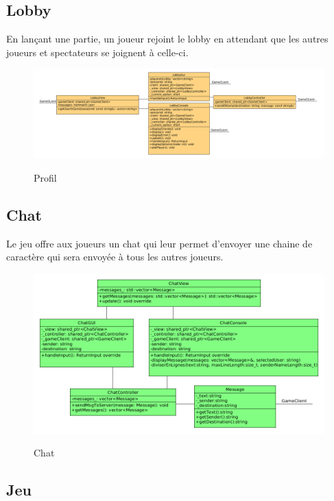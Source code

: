 \documentclass[../design_fonctionnement_sys.tex]{subfiles}
\begin{document}
\newpage
\subsection{Lobby}
En lançant une partie, un joueur rejoint le lobby en attendant que les autres joueurs et spectateurs se joignent à celle-ci. \begin{figure}[H]
    \centering
    \includegraphics[scale=0.3]{img_design/4.6_lobby_design.png}
    \label{fig:seq_match_server}
    \caption{Profil}
\end{figure}

\subsection{Chat}
Le jeu offre aux joueurs un chat qui leur permet d'envoyer une chaine de caractère qui sera envoyée à tous les autres joueurs. 
\begin{figure}[H]
    \centering
    \includegraphics[scale=0.3]{img_design/4.7_chat_design.png}
    \label{fig:seq_match_server}
    \caption{Chat}
\end{figure}

\newpage
\subsection{Jeu}
\end{document}
